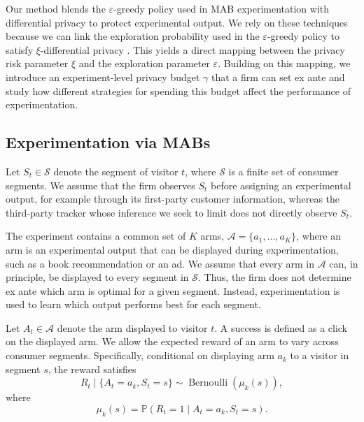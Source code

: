 \documentclass[mksc,nonblindrev]{informs3}
\begin{document}



Our method blends the $\varepsilon$-greedy policy used in MAB experimentation with differential privacy to protect experimental output. We rely on these techniques because we can link the exploration probability used in the $\varepsilon$-greedy policy to satisfy $\xi$-differential privacy \citep{Dwork_2014}. This yields a direct mapping between the privacy risk parameter $\xi$ and the exploration parameter $\varepsilon$. Building on this mapping, we introduce an experiment-level privacy budget $\gamma$ that a firm can set ex ante and study how different strategies for spending this budget affect the performance of experimentation.

\subsection{Experimentation via MABs}

Let \(S_t\in\mathcal S\) denote the segment of visitor \(t\), where \(\mathcal S\) is a finite set of consumer segments. We assume that the firm observes \(S_t\) before assigning an experimental output, for example through its first-party customer information, whereas the third-party tracker whose inference we seek to limit does not directly observe \(S_t\).

The experiment contains a common set of \(K\) arms, \(\mathcal A=\{a_1,\ldots,a_K\}\), where an arm is an experimental output that can be displayed during experimentation, such as a book recommendation or an ad. We assume that every arm in \(\mathcal A\) can, in principle, be displayed to every segment in \(\mathcal S\). Thus, the firm does not determine ex ante which arm is optimal for a given segment. Instead, experimentation is used to learn which output performs best for each segment.

Let \(A_t \in \mathcal A\) denote the arm displayed to visitor \(t\). A success is defined as a click on the displayed arm. We allow the expected reward of an arm to vary across consumer segments. Specifically, conditional on displaying arm \(a_k\) to a visitor in segment \(s\), the reward satisfies
\begin{equation}
\label{eq:segment-reward}
R_t \mid \{A_t=a_k, S_t=s\}
\sim \operatorname{Bernoulli}\!\left(\mu_k(s)\right),
\end{equation}
where
\[
\mu_k(s)
=
\mathbb{P}\!\left(
R_t = 1
\mid
A_t=a_k, S_t=s
\right).
\]
\end{document}
